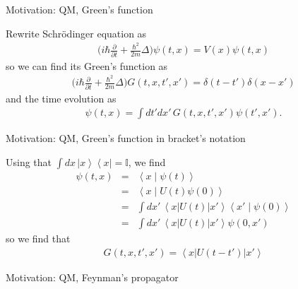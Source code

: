 \documentclass{beamer}
\newcommand{\bra}[1]{\left\langle #1\right|}
\newcommand{\ket}[1]{\left| #1 \right\rangle}
\newcommand{\bek}[3]{\left\langle #1 \right| #2 \left| #3 \right\rangle}
\newcommand{\braket}[2]{\left\langle #1 \middle| #2  \right\rangle}
\begin{document}

\begin{frame}{Motivation: QM, Green's function}

Rewrite Schr\"odinger equation as
\begin{eqnarray}
\bigg(
i\hbar
\frac{\partial}{\partial t}
+
\frac{\hbar^2}{2m}
\Delta
\bigg)
\psi(t,x)
=
V(x)
\psi(t,x)
\end{eqnarray}
so we can find its Green's function as
\begin{eqnarray}
\bigg(
i\hbar
\frac{\partial}{\partial t}
+
\frac{\hbar^2}{2m}
\Delta
\bigg)
G(t,x,t',x')
=
\delta(t-t')
\delta(x-x')
\end{eqnarray}
and the time evolution as
\begin{eqnarray}
\psi(t,x)
=
\int dt'  dx'\,
G(t,x,t',x')
\psi(t',x')
.
\end{eqnarray}

\end{frame}


\begin{frame}{Motivation: QM, Green's function in bracket's notation}

Using that $\int dx\, \ket{x}\bra{x}=\mathbb{I}$, we find
\begin{eqnarray}
\psi(t,x)
&=&
\braket{x}{\psi(t)}
\\
&=&
\braket{x}{U(t)\psi(0)}
\nonumber
\\
&=&
\int dx'\,
\bek{x}{U(t)}{x'}
\braket{x'}{\psi(0)}
\nonumber
\\
&=&
\int dx'\,
\bek{x}{U(t)}{x'}
\psi(0,x')
\nonumber
\end{eqnarray}
so we find that
\begin{eqnarray}
G(t,x,t',x')
=
\bek{x}{U(t-t')}{x'}
\end{eqnarray}

\end{frame}


\begin{frame}{Motivation: QM, Feynman's propagator}

\end{frame}

\end{document}
